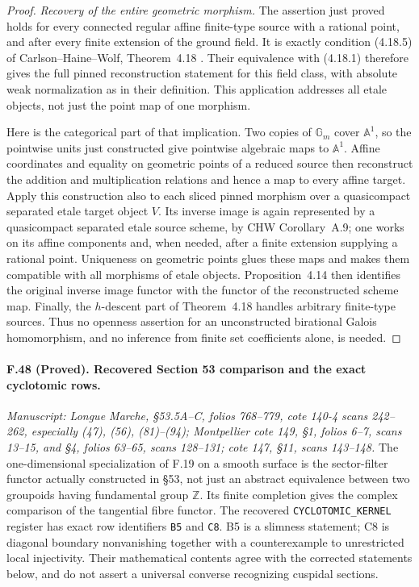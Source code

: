 \begin{proof}
\emph{Recovery of the entire geometric morphism.}
The assertion just proved holds for every connected regular affine
finite-type source with a rational point, and after every finite
extension of the ground field. It is exactly condition (4.18.5) of
Carlson--Haine--Wolf, Theorem~4.18 \citep{CHW2024}. Their equivalence
with (4.18.1) therefore gives the full pinned reconstruction statement
for this field class, with absolute weak normalization as in their
definition. This application addresses all etale objects, not just
the point map of one morphism.

Here is the categorical part of that implication. Two copies of
$\mathbb G_m$ cover $\mathbb A^1$, so the pointwise units just
constructed give pointwise algebraic maps to $\mathbb A^1$. Affine
coordinates and equality on geometric points of a reduced source
then reconstruct the addition and multiplication relations and hence
a map to every affine target. Apply this construction also to each
sliced pinned morphism over a quasicompact separated etale target
object $V$. Its inverse image is again represented by a
quasicompact separated etale source scheme, by CHW Corollary~A.9;
one works on its affine components and, when needed, after a finite
extension supplying a rational point. Uniqueness on geometric points
glues these maps and makes them compatible with all morphisms of
etale objects. Proposition~4.14 then identifies the original inverse
image functor with the functor of the reconstructed scheme map.
Finally, the $h$-descent part of Theorem~4.18 handles arbitrary
finite-type sources. Thus no openness assertion for an unconstructed
birational Galois homomorphism, and no inference from finite set
coefficients alone, is needed.

\end{proof}

\paragraph{F.48 (Proved). Recovered Section 53 comparison and the exact cyclotomic rows.}
\textit{Manuscript: Longue Marche, \S53.5A--C, folios 768--779,
cote 140-4 scans 242--262, especially (47), (56), (81)--(94);
Montpellier cote 149, \S1, folios 6--7, scans 13--15, and \S4,
folios 63--65, scans 128--131; cote 147, \S11, scans 143--148.}
The one-dimensional specialization of F.19 on a smooth surface is the sector-filter
functor actually constructed in \S53, not just an abstract equivalence
between two groupoids having fundamental group $\mathbb Z$. Its finite
completion gives the complex comparison of the tangential fibre functor.
The recovered \texttt{CYCLOTOMIC\_KERNEL} register has exact row identifiers
\texttt{B5} and \texttt{C8}. B5 is a slimness statement; C8 is diagonal
boundary nonvanishing together with a counterexample to unrestricted
local injectivity. Their mathematical contents agree with the corrected
statements below, and do not assert a universal converse recognizing
cuspidal sections.

